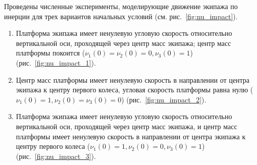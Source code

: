 Проведены численные эксперименты, моделирующие движение экипажа по инерции для трех вариантов начальных условий (см. рис.~\ref{fig:nu_impact}).
\begin{enumerate}[wide]
    \item \label{sol:self_rot} Платформа экипажа имеет ненулевую угловую скорость относительно вертикальной оси, проходящей через центр масс экипажа; центр масс платформы покоится ($\nu_1(0) = \nu_2(0) = 0, \nu_3(0) = 1$) (рис.~\ref{fig:nu_impact_1}).
    \item \label{sol:straight} Центр масс платформы имеет ненулевую скорость в направлении от центра экипажа к центру первого колеса, угловая скорость платформы равна нулю ($\nu_1(0) = 1, \nu_2(0) = \nu_3(0) = 0$) (рис.~\ref{fig:nu_impact_2}).
    \item \label{sol:wrench} Платформа экипажа имеет ненулевую угловую скорость относительно вертикальной оси, проходящей через центр масс экипажа, и центр масс платформы имеет ненулевую скорость в направлении от центра экипажа к центру первого колеса ($\nu_1(0) = 1, \nu_2(0) = 0, \nu_3(0) = 1$) (рис.~\ref{fig:nu_impact_3}).
\end{enumerate}


